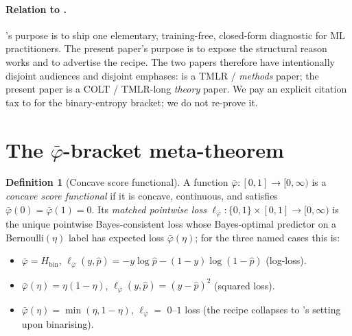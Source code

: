 \documentclass[10pt]{article}
\theoremstyle{definition}
\newtheorem{definition}[theorem]{Definition}
\theoremstyle{remark}
\newcommand{\Hbin}{H_{\mathrm{bin}}}
\newcommand{\bphi}{\bar{\varphi}}        %
\begin{document}
\paragraph{Relation to .}
's purpose is to ship one elementary,
training-free, closed-form diagnostic for ML practitioners. The
present paper's purpose is to expose the structural reason
 works and to advertise the recipe. The two
papers therefore have intentionally disjoint audiences and
disjoint emphases:  is a TMLR /
\emph{methods} paper; the present paper is a COLT / TMLR-long
\emph{theory} paper. We pay an explicit citation tax to
 for the binary-entropy bracket; we do not
re-prove it.

\section{The \texorpdfstring{$\bphi$}{phi}-bracket
  meta-theorem}\label{sec:meta}

\begin{definition}[Concave score functional]\label{def:score}
A function $\bphi:[0,1]\to[0,\infty)$ is a \emph{concave score
functional} if it is concave, continuous, and satisfies
$\bphi(0)=\bphi(1)=0$. Its \emph{matched pointwise loss}
$\ell_{\bphi}:\{0,1\}\times[0,1]\to[0,\infty)$ is the unique
pointwise Bayes-consistent loss whose Bayes-optimal predictor on
a Bernoulli$(\eta)$ label has expected loss $\bphi(\eta)$; for
the three named cases this is:
\begin{itemize}[leftmargin=*,nosep]
  \item $\bphi=\Hbin$, $\ell_{\bphi}(y,\hat p)=-y\log\hat p
        -(1-y)\log(1-\hat p)$ (log-loss).
  \item $\bphi(\eta)=\eta(1-\eta)$,
        $\ell_{\bphi}(y,\hat p)=(y-\hat p)^2$ (squared loss).
  \item $\bphi(\eta)=\min(\eta,1-\eta)$, $\ell_{\bphi}=$
        $0$--$1$ loss (the recipe collapses to
        's setting upon binarising).
\end{itemize}
\end{definition}
\end{document}
